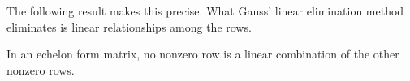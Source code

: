 
The following result makes this precise.
What Gauss' linear elimination method eliminates is linear
relationships among the rows.

\begin{lemma}      \label{le:EchFormNoLinCombo}
In an echelon form matrix,
no nonzero row is a linear combination of the other nonzero rows.
\end{lemma}

